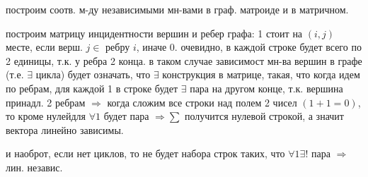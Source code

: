 \documentclass[russian]{article}
\begin{document}
построим соотв. м-ду независимыми мн-вами в граф. матроиде и в матричном.

построим матрицу инцидентности вершин и ребер графа: 1 стоит на $(i,j)$ месте, если верш. $j \in $ ребру $i$, иначе 0. очевидно, в каждой строке будет всего по 2 единицы, т.к. у ребра 2 конца. в таком случае зависимост мн-ва вершин в графе (т.е. $\exists$ цикла) будет означать, что $\exists$ конструкция в матрице, такая, что когда идем по ребрам, для каждой 1 в строке будет $\exists$ пара на другом конце, т.к. вершина принадл. 2 ребрам $\Rightarrow$ когда сложим все строки над полем 2 чисел $(1+1=0)$, то  кроме нулейдля $\forall 1$ будет пара $\Rightarrow \sum$ получится нулевой строкой, а значит вектора линейно зависимы.

и наоброт, если нет циклов, то не будет набора строк таких, что $\forall 1 \exists ! $ пара $\Rightarrow $ лин. независ.
\end{document}
